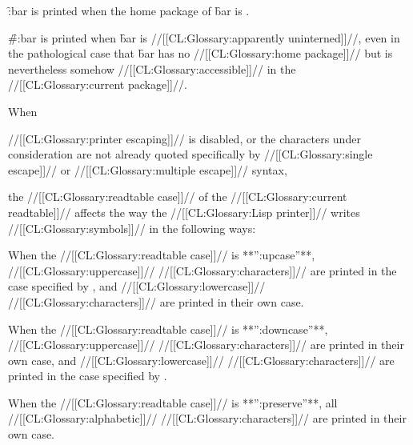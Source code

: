 
\f{:bar} is printed when the home package of \f{bar} is .
                

\f{\#:bar} is printed when \f{bar} is //[[CL:Glossary:apparently uninterned]]//,
even in the pathological case that \f{bar} 
has no //[[CL:Glossary:home package]]// but is nevertheless somehow //[[CL:Glossary:accessible]]// 
in the //[[CL:Glossary:current package]]//.
\endlist






\endsubsubsubsection%



When 

//[[CL:Glossary:printer escaping]]// is disabled,
or the characters under consideration are not already 
quoted specifically by //[[CL:Glossary:single escape]]// or //[[CL:Glossary:multiple escape]]//
syntax,

the //[[CL:Glossary:readtable case]]// of the //[[CL:Glossary:current readtable]]// 
affects the way the //[[CL:Glossary:Lisp printer]]// writes //[[CL:Glossary:symbols]]//
in the following ways:
 
\beginlist
{}

 When the //[[CL:Glossary:readtable case]]// is **'':upcase''**,
 //[[CL:Glossary:uppercase]]// //[[CL:Glossary:characters]]//
 are printed in the case specified by , and
 //[[CL:Glossary:lowercase]]// //[[CL:Glossary:characters]]// are printed in their own case.
 

 When the //[[CL:Glossary:readtable case]]// is **'':downcase''**,
 //[[CL:Glossary:uppercase]]// //[[CL:Glossary:characters]]// are printed in their own case, and
 //[[CL:Glossary:lowercase]]// //[[CL:Glossary:characters]]//
 are printed in the case specified by .
 

 When the //[[CL:Glossary:readtable case]]// is **'':preserve''**,
 all //[[CL:Glossary:alphabetic]]// //[[CL:Glossary:characters]]// are printed in their own case.
 
